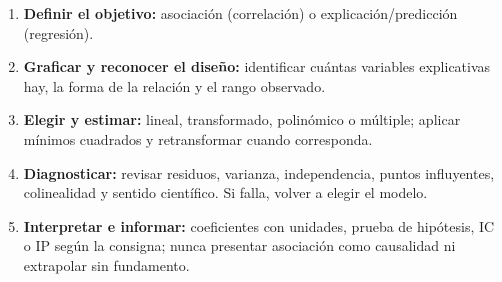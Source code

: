 \documentclass[11pt,a4paper]{article}
\begin{document}
\begin{tcolorbox}[colback=green!5!white,colframe=green!50!black,title=Procedimiento práctico de resolución]
    \begin{enumerate}
        \item \textbf{Definir el objetivo:} asociación (correlación) o explicación/predicción (regresión).
        \item \textbf{Graficar y reconocer el diseño:} identificar cuántas variables explicativas hay, la forma de la relación y el rango observado.
        \item \textbf{Elegir y estimar:} lineal, transformado, polinómico o múltiple; aplicar mínimos cuadrados y retransformar cuando corresponda.
        \item \textbf{Diagnosticar:} revisar residuos, varianza, independencia, puntos influyentes, colinealidad y sentido científico. Si falla, volver a elegir el modelo.
        \item \textbf{Interpretar e informar:} coeficientes con unidades, prueba de hipótesis, IC o IP según la consigna; nunca presentar asociación como causalidad ni extrapolar sin fundamento.
    \end{enumerate}
\end{tcolorbox}
\end{document}
